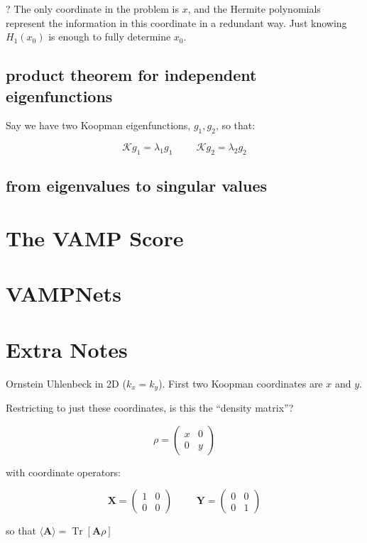 \documentclass[]{article}
\newcommand{\bk}[1]{\left[ #1 \right]}
\newcommand{\w}[1]{\mathbf{#1}}
\newcommand{\Kp}{\mathcal{K}}
\DeclareMathOperator\Tr{Tr}
\begin{document}
? The only coordinate in the problem is $x$, and the Hermite polynomials represent the information in this coordinate in a redundant way. Just knowing $H_1(x_0)$ is enough to fully determine $x_0$.



\subsection{product theorem for independent eigenfunctions}

Say we have two Koopman eigenfunctions, $g_1, g_2$, so that:

$$
\Kp g_1 = \lambda_1 g_1 \hspace{1cm} \Kp g_2 = \lambda_2 g_2
$$





\subsection{from eigenvalues to singular values}




\section{The VAMP Score}
\section{VAMPNets}
\section{Extra Notes}

Ornstein Uhlenbeck in 2D ($k_x=k_y$). First two Koopman coordinates are $x$ and $y$.

Restricting to just these coordinates, is this the ``density matrix''?

$$
\rho=\begin{pmatrix}
	x & 0 \\
	0 & y
\end{pmatrix}
$$

with coordinate operators:

$$
\w{X} = \begin{pmatrix}
	1 & 0 \\
	0 & 0
\end{pmatrix}
\hspace{1cm}
\w{Y} = \begin{pmatrix}
	0 & 0 \\
	0 & 1
\end{pmatrix}
$$

so that $\langle \w{A} \rangle = \Tr\bk{\w{A}\rho}$
\end{document}

